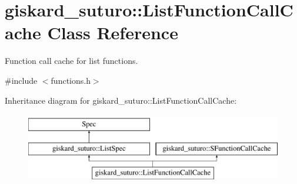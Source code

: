 \hypertarget{classgiskard__suturo_1_1ListFunctionCallCache}{\section{giskard\-\_\-suturo\-:\-:List\-Function\-Call\-Cache Class Reference}
\label{classgiskard__suturo_1_1ListFunctionCallCache}
}


Function call cache for list functions.  




{\ttfamily \#include $<$functions.\-h$>$}

Inheritance diagram for giskard\-\_\-suturo\-:\-:List\-Function\-Call\-Cache\-:\begin{figure}[H]
\begin{center}
\leavevmode
\includegraphics[height=3.000000cm]{classgiskard__suturo_1_1ListFunctionCallCache}
\end{center}
\end{figure}
